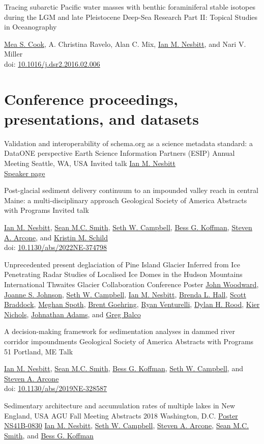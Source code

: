 \documentclass[a4paper,12pt,sans,colorlinks]{moderncv}
\newcommand{\me}{\href{https://www.iannesbitt.org}{Ian M. Nesbitt}}
\newcommand{\seth}{\href{https://www.alpinesciences.net}{Seth W. Campbell}}
\newcommand{\sean}{\href{https://umaine.edu/earthclimate/people/sean-m-c-smith/}{Sean M.C. Smith}}
\newcommand{\bess}{\href{https://www.colby.edu/directory/profile/bess.koffman/}{Bess G. Koffman}}
\newcommand{\stevearcone}{\href{https://engineering.dartmouth.edu/community/faculty/steven-arcone}{Steven A. Arcone}}
\newcommand{\kristin}{\href{https://climatechange.umaine.edu/people/kristin-schild/}{Kristin M. Schild}}
\newcommand{\mea}{\href{https://geosciences.williams.edu/profile/msc1/}{Mea S. Cook}}
\newcommand{\johnwoodward}{\href{https://www.northumbria.ac.uk/about-us/our-staff/w/john-woodward}{John Woodward}}
\newcommand{\joannejohnson}{\href{https://www.bas.ac.uk/profile/jsj/}{Joanne S. Johnson}}
\newcommand{\brenda}{\href{https://climatechange.umaine.edu/people/brenda-hall/}{Brenda L. Hall}}
\newcommand{\scott}{\href{https://climatechange.umaine.edu/people/scott-braddock/}{Scott Braddock}}
\newcommand{\meghan}{\href{https://climatechange.umaine.edu/people/meghan-spoth/}{Meghan Spoth}}
\newcommand{\brent}{\href{https://sse.tulane.edu/eens/faculty/goehring}{Brent Goehring}}
\newcommand{\ryanventurelli}{\href{https://sse.tulane.edu/eens/faculty/venturelli}{Ryan Venturelli}}
\newcommand{\dylanrood}{\href{http://www.imperial.ac.uk/people/d.rood}{Dylan H. Rood}}
\newcommand{\kiernichols}{\href{https://www.researchgate.net/profile/Keir-Nichols}{Kier Nichols}}
\newcommand{\johnathanadams}{\href{https://thwaitesglacier.org/people/jonathan-adams}{Johnathan Adams}}
\newcommand{\gregbalco}{\href{https://www.bgc.org/greg-balco}{Greg Balco}}
\newcommand{\agudc}{\href{https://agu.confex.com/agu/fm18/meetingapp.cgi/Paper/449070}{Poster NS41B-0830}}
\newcommand{\doi}[1]{%
    \href{https://doi.org/#1}{#1}
}
\begin{document}
{Tracing subarctic Pacific water masses with benthic
foraminiferal stable isotopes during the LGM and late
Pleistocene}
{Deep-Sea Research Part II: Topical Studies in Oceanography}
{}
{}
{
    \mea{}, A. Christina Ravelo, Alan C. Mix, \me{},
    and Nari V. Miller
    \\
    doi: \doi{10.1016/j.dsr2.2016.02.006}
}


\section{Conference proceedings, presentations, and datasets}

{Validation and interoperability of schema.org as a science metadata standard: a DataONE perspective}
{Earth Science Information Partners (ESIP) Annual Meeting}
{Seattle, WA, USA}
{Invited talk}
{
    \me{}
    \\
    \href{https://2025julyesipmeeting.sched.com/speaker/iannesbitt}{Speaker page}
}

{Post-glacial sediment delivery continuum to an impounded
valley reach in central Maine: a multi-disciplinary approach}
{Geological Society of America Abstracts with Programs}
{}
{Invited talk}
{
    \me{}, \sean{}, \seth{}, \bess{}, \stevearcone{}, and \kristin{}
    \\
    doi: \doi{10.1130/abs/2022NE-374798}
}

{Unprecedented present deglaciation of Pine Island Glacier
Inferred from Ice Penetrating Radar Studies of Localised
Ice Domes in the Hudson Mountains}
{International Thwaites Glacier Collaboration Conference}
{}
{Poster}
{
    \johnwoodward{}, \joannejohnson{}, \seth{}, \me{}, \brenda{}, \scott{},
    \meghan{}, \brent{}, \ryanventurelli{}, \dylanrood{}, \kiernichols{},
    \johnathanadams{}, and \gregbalco{}
}

{A decision-making framework for sedimentation analyses in
dammed river corridor impoundments}
{Geological Society of America Abstracts with Programs 51}
{Portland, ME}
{Talk}
{
    \me{}, \sean{}, \bess{}, \seth{}, and \stevearcone{}
    \\
    doi: \doi{10.1130/abs/2019NE-328587}
}

{Sedimentary architecture and accumulation rates of
multiple lakes in New England, USA}
{AGU Fall Meeting Abstracts 2018}
{Washington, D.C.}
{\agudc}
{
    \me{}, \seth{}, \stevearcone{}, \sean{}, and \bess{}
}
\end{document}
